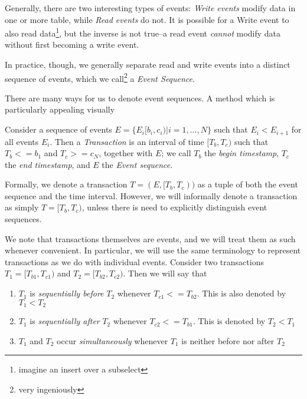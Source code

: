 Generally, there are two interesting types of events: \emph{Write events} modify data in one or more table, while \emph{Read events} do not. It is possible for a Write event to also read data\footnote{imagine an insert over a subselect}, but the inverse is not true--a read event \emph{cannot} modify data without first becoming a write event. 

In practice, though, we generally separate read and write events into a distinct sequence of events, which we call\footnote{very ingeniously} a \emph{Event Sequence}. 

There are many ways for us to denote event sequences. A method which is particularly appealing visually

\begin{defn}[Transaction]
Consider a sequence of events $E=\{E_i[b_i,c_i) | i=1,...,N\}$ such that $E_i < E_{i+1}$ for all events $E_i$. Then a \emph{Transaction} is an interval of time $[T_b,T_c)$ such that $T_b <=b_1$ and $T_c >= c_N$, together with $E$; we call $T_b$ the \emph{begin timestamp}, $T_c$ the \emph{end timestamp}, and $E$ the \emph{Event sequence}. 
\end{defn}

Formally, we denote a transaction $T=(E,[T_b,T_c))$ as a tuple of both the event sequence and the time interval. However, we will informally denote a transaction as simply $T = [T_b,T_c)$, unless there is need to explicitly distinguish event sequences.

We note that transactions themselves are events, and we will treat them as such whenever convenient. In particular, we will use the same terminology to represent transactions as we do with individual events. Consider two transactions $T_1=[T_{b1},T_{c1})$ and $T_2=[T_{b2},T_{c2})$. Then we will say that

\begin{enumerate}
\item $T_1$ is \emph{sequentially before} $T_2$ whenever $T_{c1} <= T_{b2}$. This is also denoted by $T_1 < T_2$
\item $T_1$ is \emph{sequentially after} $T_2$ whenever $T_{c2} <= T_{b1}$. This is denoted by $T_2 < T_1$
\item $T_1$ and $T_2$ occur \emph{simultaneously} whenever $T_1$ is neither before nor after $T_2$
\end{enumerate}



